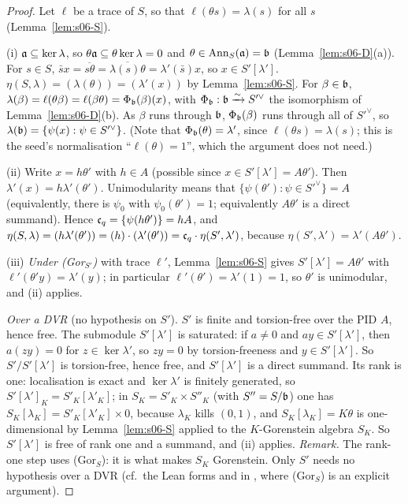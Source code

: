 \begin{proof}
Let $\ell$ be a trace of $S$, so that $\ell(\theta s)=\lambda(s)$ for all $s$ (Lemma~\ref{lem:s06-S}).

(i) $\mathfrak{a}\subseteq\ker\lambda$, so $\theta\mathfrak{a}\subseteq\theta\ker\lambda=0$ and $\theta\in\operatorname{Ann}_S(\mathfrak{a})=\mathfrak{b}$ (Lemma~\ref{lem:s06-D}(a)). For $s\in S$,
$\bar s x=\overline{s\theta}=\overline{\lambda(s)\theta}=\lambda'(\bar s)x$, so $x\in S'[\lambda']$. $\eta(S,\lambda)=(\lambda(\theta))=(\lambda'(x))$
by Lemma~\ref{lem:s06-S}. For $\beta\in\mathfrak{b}$, $\lambda(\beta)=\ell(\theta\beta)=\ell(\beta\theta)=\Phi_{\mathfrak{b}}(\beta)(x)$, with $\Phi_{\mathfrak{b}}:\mathfrak{b}\xrightarrow\sim
S'^\vee$ the isomorphism of Lemma~\ref{lem:s06-D}(b). As $\beta$ runs through $\mathfrak{b}$, $\Phi_{\mathfrak{b}}(\beta)$ runs through all of $S'^\vee$, so
$\lambda(\mathfrak{b})=\{\psi(x):\psi\in S'^\vee\}$. (Note that $\Phi_{\mathfrak{b}}(\theta)=\lambda'$, since $\ell(\theta s)=\lambda(s)$; this is the seed's
normalisation ``$\ell(\theta)=1$'', which the argument does not need.)

(ii) Write $x=h\theta'$ with $h\in A$ (possible since $x\in S'[\lambda']=A\theta'$). Then $\lambda'(x)=h\lambda'(\theta')$. Unimodularity
means that $\{\psi(\theta'):\psi\in S'^\vee\}=A$ (equivalently, there is $\psi_0$ with $\psi_0(\theta')=1$; equivalently $A\theta'$ is a
direct summand). Hence $\mathfrak{c}_q=\{\psi(h\theta')\}=hA$, and
$\eta(S,\lambda)=(h\lambda'(\theta'))=(h)\cdot(\lambda'(\theta'))=\mathfrak{c}_q\cdot\eta(S',\lambda')$, because $\eta(S',\lambda')=\lambda'(A\theta')$.

(iii) \emph{Under (Gor$_{S'}$)} with trace $\ell'$, Lemma~\ref{lem:s06-S} gives $S'[\lambda']=A\theta'$ with $\ell'(\theta'y)=\lambda'(y)$; in
particular $\ell'(\theta')=\lambda'(1)=1$, so $\theta'$ is unimodular, and (ii) applies.

\emph{Over a DVR} (no hypothesis on $S'$). $S'$ is finite and torsion-free over the PID $A$, hence free. The submodule $S'[\lambda']$ is
saturated: if $a\ne0$ and $ay\in S'[\lambda']$, then $a(zy)=0$ for $z\in\ker\lambda'$, so $zy=0$ by torsion-freeness and $y\in S'[\lambda']$.
So $S'/S'[\lambda']$ is torsion-free, hence free, and $S'[\lambda']$ is a direct summand. Its rank is one: localisation is exact and
$\ker\lambda'$ is finitely generated, so $S'[\lambda']_K=S'_K[\lambda'_K]$; in $S_K=S'_K\times S''_K$ (with $S''=S/\mathfrak{b}$) one has
$S_K[\lambda_K]=S'_K[\lambda'_K]\times0$, because $\lambda_K$ kills $(0,1)$, and $S_K[\lambda_K]=K\theta$ is one-dimensional by
Lemma~\ref{lem:s06-S} applied to the $K$-Gorenstein algebra $S_K$. So $S'[\lambda']$ is free of rank one and a summand, and (ii) applies.
\emph{Remark.} The rank-one step uses (Gor$_S$): it is what makes $S_K$ Gorenstein. Only $S'$ needs no hypothesis over a DVR
(cf.\ the Lean forms  and  in , where (Gor$_S$) is an explicit argument).


\end{proof}
